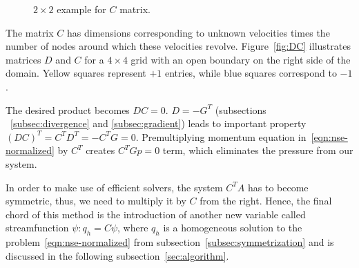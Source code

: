 \documentclass{article}
\begin{document}
\begin{figure}[h] %
  \caption{$2\times 2$ example for $C$ matrix.}\label{fig:C-example-2x2}
\end{figure}


The matrix $C$ has dimensions corresponding to unknown velocities times the number of nodes around which these velocities revolve. Figure~\ref{fig:DC} illustrates matrices $D$ and $C$ for a $4\times4$ grid with an open boundary on the right side of the domain. Yellow squares represent $+1$ entries, while blue squares correspond to $-1$. 

The desired product becomes $DC=0$. $D=-G^T$ (subsections ~\ref{subsec:divergence} and \ref{subsec:gradient}) leads to important property $(DC)^T=C^TD^T=-C^TG=0$. Premultiplying momentum equation in~\eqref{eqn:nse-normalized} by $C^T$ creates $C^TGp=0$ term, which eliminates the pressure from our system.

In order to make use of efficient solvers, the system $C^TA$ has to become symmetric, thus, we need to multiply it by $C$ from the right. Hence, the final chord of this method is the introduction of another new variable called streamfunction $\psi:q_h=C\psi$, where $q_h$ is a homogeneous solution to the problem~\eqref{eqn:nse-normalized} from subsection~\ref{subsec:symmetrization} and is discussed in the following subsection~\ref{sec:algorithm}.
\end{document}
